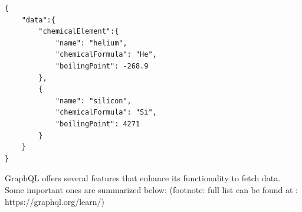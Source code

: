 \begin{minipage}{\linewidth}
\begin{lstlisting}[label=listing:listing5, caption={Query to fetch chemical elements and their properties}]
{
	"data":{
		"chemicalElement":{
			"name": "helium",
			"chemicalFormula": "He",
			"boilingPoint": -268.9
		},
		{	
			"name": "silicon",
			"chemicalFormula": "Si",
			"boilingPoint": 4271
		}
	}
}

\end{lstlisting}
\end{minipage}



GraphQL offers several features that enhance its functionality to fetch data. Some important ones are summarized below: (footnote: full list can be found at : https://graphql.org/learn/)

